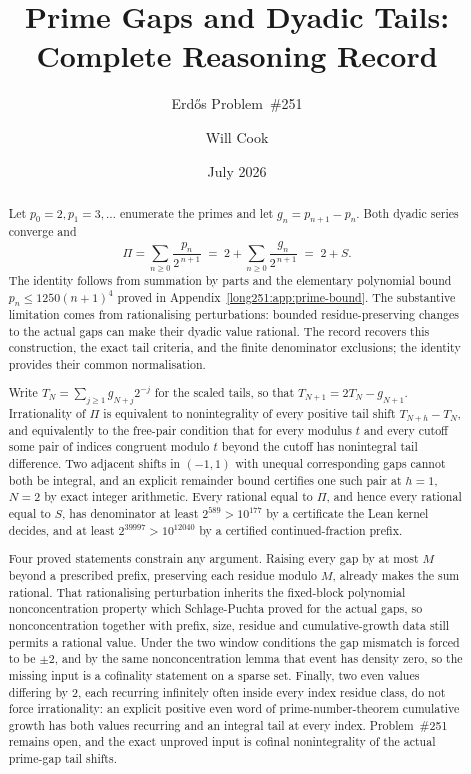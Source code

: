 \documentclass[11pt]{article}
\title{Prime Gaps and Dyadic Tails: Complete Reasoning Record}
\subtitle{Erd\H{o}s Problem~\#251}
\author{Will Cook}
\date{July 2026}
\begin{document}
\maketitle
\noteprovenance

\begin{abstract}
\noindent
Let $p_0=2,p_1=3,\ldots$ enumerate the primes and let $g_n=p_{n+1}-p_n$.  Both
dyadic series converge and
\[
 \Pi=\sum_{n\ge0}\frac{p_n}{2^{\,n+1}}
 \;=\;2+\sum_{n\ge0}\frac{g_n}{2^{\,n+1}}\;=\;2+S .
\]
The identity follows from summation by parts and the elementary polynomial
bound $p_n\le1250(n+1)^4$ proved in Appendix~\ref{long251:app:prime-bound}.
The substantive limitation comes from rationalising perturbations: bounded
residue-preserving changes to the actual gaps can make their dyadic value
rational.  The record recovers this construction, the exact tail criteria,
and the finite denominator exclusions; the identity provides their common
normalisation.

Write $T_N=\sum_{j\ge1}g_{N+j}2^{-j}$ for the scaled tails, so that
$T_{N+1}=2T_N-g_{N+1}$.  Irrationality of $\Pi$ is equivalent to
nonintegrality of every positive tail shift $T_{N+h}-T_N$, and equivalently to
the free-pair condition that for every modulus $t$ and every cutoff some pair
of indices congruent modulo $t$ beyond the cutoff has nonintegral tail
difference.  Two adjacent shifts in $(-1,1)$ with unequal corresponding gaps
cannot both be integral, and an explicit remainder bound certifies one such
pair at $h=1$, $N=2$ by exact integer arithmetic.  Every rational equal to
$\Pi$, and hence every rational equal to $S$, has denominator at least
$2^{589}>10^{177}$ by a certificate the Lean kernel decides, and at least
$2^{39997}>10^{12040}$ by a certified continued-fraction prefix.

Four proved statements constrain any argument.  Raising every gap by at most
$M$ beyond a prescribed prefix, preserving each residue modulo $M$, already
makes the sum rational.  That rationalising perturbation inherits the
fixed-block polynomial nonconcentration property which Schlage-Puchta proved
for the actual gaps, so nonconcentration together with prefix, size, residue
and cumulative-growth data still permits a rational value.  Under the two
window conditions the gap mismatch is forced to be $\pm2$, and by the same
nonconcentration lemma that event has density zero, so the missing input is a
cofinality statement on a sparse set.  Finally, two even values differing by
$2$, each recurring infinitely often inside every index residue class, do not
force irrationality: an explicit positive even word of prime-number-theorem
cumulative growth has both values recurring and an integral tail at every
index.  Problem~\#251 remains open, and the exact unproved input is cofinal
nonintegrality of the actual prime-gap tail shifts.
\end{abstract}
\end{document}
